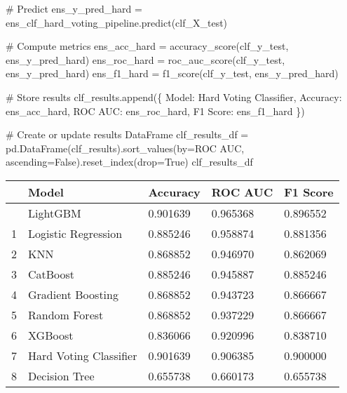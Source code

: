 \documentclass[
  letterpaper,
  DIV=11,
  numbers=noendperiod]{scrreprt}
\newenvironment{Shaded}{\begin{snugshade}}{\end{snugshade}}
\newcommand{\CommentTok}[1]{\textcolor[rgb]{0.37,0.37,0.37}{#1}}
\newcommand{\NormalTok}[1]{\textcolor[rgb]{0.00,0.23,0.31}{#1}}
\newcommand{\OperatorTok}[1]{\textcolor[rgb]{0.37,0.37,0.37}{#1}}
\newcommand{\StringTok}[1]{\textcolor[rgb]{0.13,0.47,0.30}{#1}}
\newcommand{\VariableTok}[1]{\textcolor[rgb]{0.07,0.07,0.07}{#1}}
\begin{document}
\begin{Shaded}
\begin{Highlighting}[]
\CommentTok{\# Predict}
\NormalTok{ens\_y\_pred\_hard }\OperatorTok{=}\NormalTok{ ens\_clf\_hard\_voting\_pipeline.predict(clf\_X\_test)}

\CommentTok{\# Compute metrics}
\NormalTok{ens\_acc\_hard }\OperatorTok{=}\NormalTok{ accuracy\_score(clf\_y\_test, ens\_y\_pred\_hard)}
\NormalTok{ens\_roc\_hard }\OperatorTok{=}\NormalTok{ roc\_auc\_score(clf\_y\_test, ens\_y\_pred\_hard)}
\NormalTok{ens\_f1\_hard }\OperatorTok{=}\NormalTok{ f1\_score(clf\_y\_test, ens\_y\_pred\_hard)}

\CommentTok{\# Store results}
\NormalTok{clf\_results.append(\{}
    \StringTok{\textquotesingle{}Model\textquotesingle{}}\NormalTok{: }\StringTok{\textquotesingle{}Hard Voting Classifier\textquotesingle{}}\NormalTok{,}
    \StringTok{\textquotesingle{}Accuracy\textquotesingle{}}\NormalTok{: ens\_acc\_hard,}
    \StringTok{\textquotesingle{}ROC AUC\textquotesingle{}}\NormalTok{: ens\_roc\_hard,}
    \StringTok{\textquotesingle{}F1 Score\textquotesingle{}}\NormalTok{: ens\_f1\_hard}
\NormalTok{\})}

\CommentTok{\# Create or update results DataFrame}
\NormalTok{clf\_results\_df }\OperatorTok{=}\NormalTok{ pd.DataFrame(clf\_results).sort\_values(by}\OperatorTok{=}\StringTok{\textquotesingle{}ROC AUC\textquotesingle{}}\NormalTok{, ascending}\OperatorTok{=}\VariableTok{False}\NormalTok{).reset\_index(drop}\OperatorTok{=}\VariableTok{True}\NormalTok{)}
\NormalTok{clf\_results\_df}
\end{Highlighting}
\end{Shaded}

\begin{longtable}[]{@{}lllll@{}}
\toprule\noalign{}
& Model & Accuracy & ROC AUC & F1 Score \\
\midrule\noalign{}
\endhead
\bottomrule\noalign{}
\endlastfoot
0 & LightGBM & 0.901639 & 0.965368 & 0.896552 \\
1 & Logistic Regression & 0.885246 & 0.958874 & 0.881356 \\
2 & KNN & 0.868852 & 0.946970 & 0.862069 \\
3 & CatBoost & 0.885246 & 0.945887 & 0.885246 \\
4 & Gradient Boosting & 0.868852 & 0.943723 & 0.866667 \\
5 & Random Forest & 0.868852 & 0.937229 & 0.866667 \\
6 & XGBoost & 0.836066 & 0.920996 & 0.838710 \\
7 & Hard Voting Classifier & 0.901639 & 0.906385 & 0.900000 \\
8 & Decision Tree & 0.655738 & 0.660173 & 0.655738 \\
\end{longtable}
\end{document}
